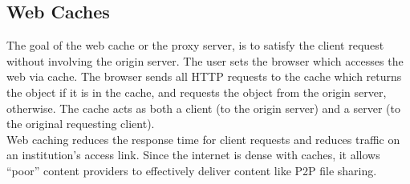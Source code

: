 \documentclass[twoside]{article}
\begin{document}
\subsection{Web Caches}
The goal of the web cache or the proxy server, is to satisfy the client 
request without involving the origin server. The user sets the browser which
accesses the web via cache. The browser sends all HTTP requests to the cache
which returns the object if it is in the cache, and requests the object from
the origin server, otherwise. The cache acts as both a client (to the origin
server) and a server (to the original requesting client). \\

Web caching reduces the response time for client requests and reduces traffic 
on an institution's access link. Since the internet is dense with caches, it 
allows ``poor'' content providers to effectively deliver content like P2P file
sharing.
\end{document}

